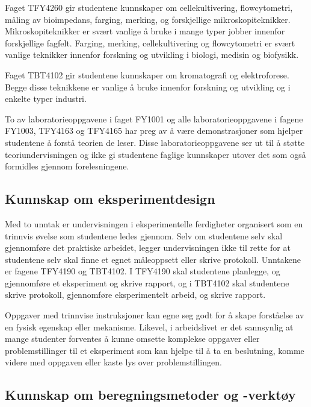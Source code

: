 \documentclass{article}
\begin{document}
Faget TFY4260 gir studentene kunnskaper om cellekultivering, flowcytometri, måling av bioimpedans, farging, merking, og forskjellige mikroskopiteknikker. Mikroskopiteknikker er svært vanlige å bruke i mange typer jobber innenfor forskjellige fagfelt. Farging, merking, cellekultivering og flowcytometri er svært vanlige teknikker innenfor forskning og utvikling i biologi, medisin og biofysikk.

Faget TBT4102 gir studentene kunnskaper om kromatografi og elektroforese. Begge disse teknikkene er vanlige å bruke innenfor forskning og utvikling og i enkelte typer industri.

To av laboratorieoppgavene i faget FY1001 og alle laboratorieoppgavene i fagene FY1003, TFY4163 og TFY4165 har preg av å være demonstrasjoner som hjelper studentene å forstå teorien de leser. Disse laboratorieoppgavene ser ut til å støtte teoriundervisningen og ikke gi studentene faglige kunnskaper utover det som også formidles gjennom forelesningene.

\subsection{Kunnskap om eksperimentdesign}
Med to unntak er undervisningen i eksperimentelle ferdigheter organisert som en trinnvis øvelse som studentene ledes gjennom. Selv om studentene selv skal gjennomføre det praktiske arbeidet, legger undervisningen ikke til rette for at studentene selv skal finne et egnet måleoppsett eller skrive protokoll. Unntakene er fagene TFY4190 og TBT4102. I TFY4190 skal studentene planlegge, og gjennomføre et eksperiment og skrive rapport, og i TBT4102 skal studentene skrive protokoll, gjennomføre eksperimentelt arbeid, og skrive rapport.

Oppgaver med trinnvise instruksjoner kan egne seg godt for å skape forståelse av en fysisk egenskap eller mekanisme. Likevel, i arbeidslivet er det sannsynlig at mange studenter forventes å kunne omsette komplekse oppgaver eller problemstillinger til et eksperiment som kan hjelpe til å ta en beslutning, komme videre med oppgaven eller kaste lys over problemstillingen.

\subsection{Kunnskap om beregningsmetoder og -verktøy}
\end{document}
